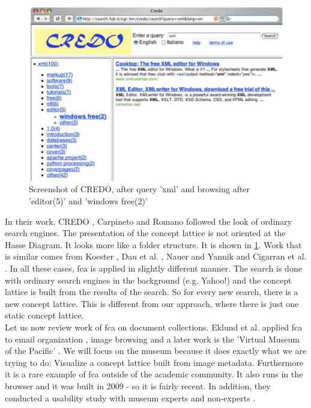 \documentclass[11pt]{report}
\begin{document}
\begin{figure}[!ht]
	\centering
	\includegraphics[width=\linewidth]{images/credo}
\caption{Screenshot of CREDO, after query 'xml' and browsing after 'editor(5)' and 'windows free(2)' \cite{Carpineto2004} }
\label{figure:credo}
\end{figure}

In their work, CREDO \cite{Carpineto2004}, Carpineto and Romano followed the look of ordinary search engines. The presentation of the concept lattice is not oriented at the Hasse Diagram. It looks more like a folder structure. It is shown in \ref{figure:credo}. Work that is similar comes from Koester \cite{Koester2006}, Dau et al. \cite{Dau2008}, Nauer and Yannik \cite{Nauer2009} and Cigarran et al. \cite{Cigarran2004}. In all these cases, \acrshort{fca} is applied in slightly different manner. The search is done with ordinary search engines in the background (e.g. Yahoo!) and the concept lattice is built from the results of the search. So for every new search, there is a new concept lattice. This is different from our approach, where there is just one static concept lattice. \\

Let us now review work of \acrshort{fca} on document collections. Eklund et al. applied \acrshort{fca} to email organization \cite{Eklund2004}, image browsing \cite{Ducrou2006,Ducrou2008} and a later work is the 'Virtual Museum of the Pacific' \cite{Eklund2009,Eklund2012}. We will focus on the museum because it does exactly what we are trying to do: Visualize a concept lattice built from image metadata. Furthermore it is a rare example of \acrshort{fca} outside of the academic community. It also runs in the browser and it was built in 2009 - so it is fairly recent. In addition, they conducted a usability study with museum experts and non-experts \cite{Eklund2012}.
\end{document}
